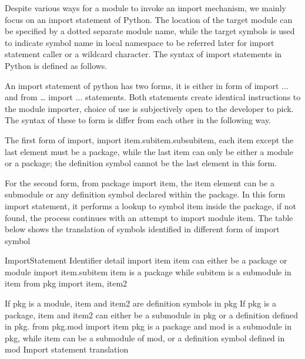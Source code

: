 Despite various ways for a module to invoke an import mechanism, we mainly focus on an import statement of Python. The location of the target module can be specified by a dotted separate module name, while the target symbols is used to indicate symbol name in local namespace to be referred later for import statement caller or a wildcard character. The syntax of import statements in Python is defined as follows.



An import statement of python has two forms, it is either in form of import ... and from … import ... statements. Both statements create identical instructions to the module importer, choice of use is subjectively open to the developer to pick. The syntax of these to form is differ from each other in the following way.

The first form of import, import item.subitem.subsubitem, each item except the last element must be a package, while the last item can only be either a module or a package; the definition symbol cannot be the last element in this form.

For the second form, from package import item, the item element can be a submodule or any definition symbol declared within the package. In this form import statement, it performs a lookup to symbol item inside the package, if not found, the process continues with an attempt to import module item. The table below shows the translation of symbols identified in different form of import symbol


ImportStatement
Identifier detail
import item
item can either be a package or module
import item.subitem
item is a package while subitem is a submodule in item
from pkg import item, item2



If pkg is a module, item and item2 are definition symbols in pkg
If pkg is a package, item and item2 can either be a submodule in pkg or a definition defined in pkg.
from pkg.mod import item
pkg is a package and mod is a submodule in pkg, while item can be a submodule of mod, or a definition symbol defined in mod
Import statement translation

